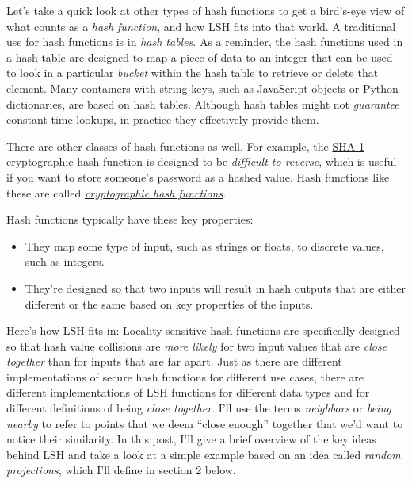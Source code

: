 \documentclass[20pt,]{extarticle}
\providecommand{\tightlist}{%
  \setlength{\itemsep}{0pt}\setlength{\parskip}{0pt}}
\begin{document}
Let's take a quick look at other types of hash functions to get a
bird's-eye view of what counts as a \emph{hash function}, and how LSH
fits into that world. A traditional use for hash functions is in
\emph{hash tables}. As a reminder, the hash functions used in a hash
table are designed to map a piece of data to an integer that can be used
to look in a particular \emph{bucket} within the hash table to retrieve
or delete that element. Many containers with string keys, such as
JavaScript objects or Python dictionaries, are based on hash tables.
Although hash tables might not \emph{guarantee} constant-time lookups,
in practice they effectively provide them.

There are other classes of hash functions as well. For example, the
\href{https://en.wikipedia.org/wiki/SHA-1}{SHA-1} cryptographic hash
function is designed to be \emph{difficult to reverse}, which is useful
if you want to store someone's password as a hashed value. Hash
functions like these are called
\href{https://en.wikipedia.org/wiki/Cryptographic_hash_function}{\emph{cryptographic
hash functions}}.

Hash functions typically have these key properties:

\begin{itemize}
\tightlist
\item
  They map some type of input, such as strings or floats, to discrete
  values, such as integers.
\item
  They're designed so that two inputs will result in hash outputs that
  are either different or the same based on key properties of the
  inputs.
\end{itemize}

Here's how LSH fits in: Locality-sensitive hash functions are
specifically designed so that hash value collisions are \emph{more
likely} for two input values that are \emph{close together} than for
inputs that are far apart. Just as there are different implementations
of secure hash functions for different use cases, there are different
implementations of LSH functions for different data types and for
different definitions of being \emph{close together}. I'll use the terms
\emph{neighbors} or \emph{being nearby} to refer to points that we deem
``close enough'' together that we'd want to notice their similarity. In
this post, I'll give a brief overview of the key ideas behind LSH and
take a look at a simple example based on an idea called \emph{random
projections}, which I'll define in section 2 below.
\end{document}
